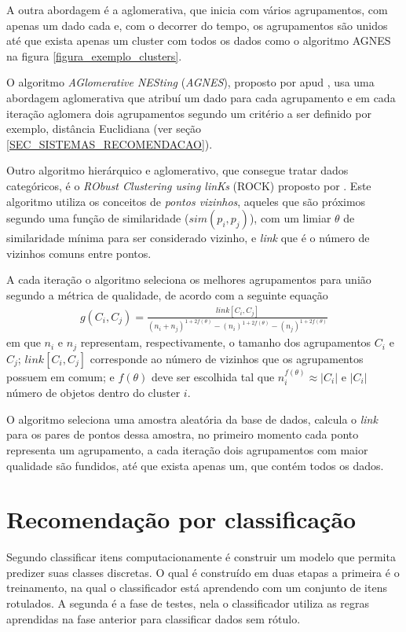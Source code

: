 A outra abordagem é a aglomerativa, que inicia com vários agrupamentos, com apenas um dado cada e, com o decorrer do tempo, os agrupamentos são unidos até que exista apenas um cluster com todos os dados como o algoritmo AGNES na figura \ref{figura_exemplo_clusters}.

O algoritmo \emph{AGlomerative NESting} (\emph{AGNES}), proposto por  apud , usa uma abordagem aglomerativa que atribuí um dado para cada agrupamento e em cada iteração aglomera dois agrupamentos segundo um critério a ser definido por exemplo, distância Euclidiana (ver seção \ref{SEC_SISTEMAS_RECOMENDACAO}).

Outro algoritmo hierárquico e aglomerativo, que consegue tratar dados categóricos, é o \emph{RObust Clustering using linKs} (ROCK) proposto por . Este algoritmo utiliza os conceitos de \emph{pontos vizinhos}, aqueles que são próximos segundo uma função de similaridade (\(sim(p_{i}, p_{j})\)), com um limiar \(\theta\) de similaridade mínima para ser considerado vizinho, e \emph{link} que é o número de vizinhos comuns entre pontos.

A cada iteração o algoritmo seleciona os melhores agrupamentos para união segundo a métrica de qualidade, de acordo com a seguinte equação
\begin{align}
g(C_{i}, C_{j}) = \frac{link[C_{i}, C_{j}]}{(n_{i}+n_{j})^{1+2f(\theta)}-(n_{i})^{1+2f(\theta)}-(n_{j})^{1+2f(\theta)}}
\end{align}
em que \(n_{i}\) e \(n_{j}\) representam, respectivamente, o tamanho dos agrupamentos \(C_{i}\) e \(C_{j}\); \(link[C_{i}, C_{j}]\) corresponde ao número de vizinhos que os agrupamentos possuem em comum; e \(f(\theta)\) deve ser escolhida tal que \(n_{i}^{f(\theta)} \approx |C_{i}|\) e \(|C_{i}|\) número de objetos dentro do cluster \(i\).

O algoritmo seleciona uma amostra aleatória da base de dados, calcula o \emph{link} para os pares de pontos dessa amostra, no primeiro momento cada ponto representa um agrupamento, a cada iteração dois agrupamentos com maior qualidade são fundidos, até que exista apenas um, que contém todos os dados.

\section{Recomendação por classificação}\label{SEC_RECOMENDACAO_CLASSIFICACAO}
Segundo  classificar itens computacionamente é construir um modelo que permita predizer suas classes discretas. O qual é construído em duas etapas a primeira é o treinamento, na qual o classificador está aprendendo com um conjunto de itens rotulados. A segunda é a fase de testes, nela o classificador utiliza as regras aprendidas na fase anterior para classificar dados sem rótulo.


